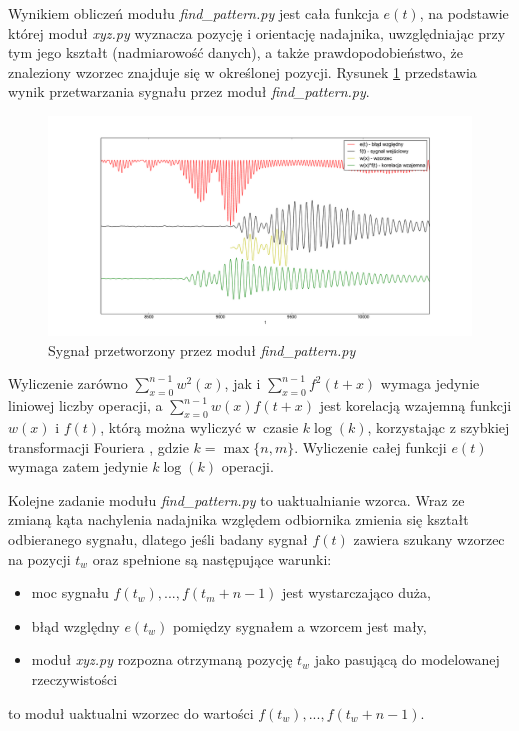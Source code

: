  Wynikiem obliczeń modułu \textit{find\_pattern.py} jest cała funkcja $e(t)$, na podstawie której moduł \textit{xyz.py}
 wyznacza pozycję i orientację nadajnika, uwzględniając przy tym 
 jego kształt (nadmiarowość danych), a także prawdopodobieństwo, że znaleziony wzorzec znajduje się w określonej pozycji.
 Rysunek \ref{fig:blad_korel} przedstawia wynik przetwarzania sygnału przez moduł \textit{find\_pattern.py}.

\begin{figure}[h]
    \centering
    \includegraphics[width=1.0\textwidth, trim= 50mm 0mm 40mm 0mm,clip]{blad_korel}
    \caption{Sygnał przetworzony przez moduł \textit{find\_pattern.py}}
    \label{fig:blad_korel}
\end{figure}
 
 
 Wyliczenie zarówno $ \sum\limits_{x=0}^{n-1}  w^2(x) $,
jak i $\sum\limits_{x=0}^{n-1} f^2(t+x)$ wymaga jedynie liniowej liczby operacji, a 
 $\sum\limits_{x=0}^{n-1}  w(x) f(t+x) $ jest korelacją wzajemną funkcji $w(x)$ i $f(t)$, którą
 można wyliczyć w~czasie $k \log(k)$, korzystając z szybkiej transformacji Fouriera \cite{bib:FFT_correlation},
 gdzie $k = \max \{n,m\}$. Wyliczenie całej funkcji $e(t)$ wymaga zatem jedynie $k \log(k)$ operacji.

 
 Kolejne zadanie modułu \textit{find\_pattern.py} to uaktualnianie wzorca.
 Wraz ze zmianą kąta nachylenia nadajnika względem odbiornika zmienia się kształt odbieranego sygnału,
 dlatego jeśli badany sygnał $f(t)$ zawiera szukany wzorzec na pozycji $t_w$ 
 oraz spełnione są następujące warunki:
 \begin{itemize}
  \item moc sygnału $f(t_w), ..., f(t_m+n-1)$ jest wystarczająco duża,
  \item błąd względny $e(t_w)$ pomiędzy sygnałem a wzorcem jest mały,
  \item moduł \textit{xyz.py} rozpozna otrzymaną pozycję $t_w$ jako pasującą do modelowanej rzeczywistości
 \end{itemize}
to moduł uaktualni wzorzec do wartości $f(t_w), ..., f(t_w+n-1)$.
 
